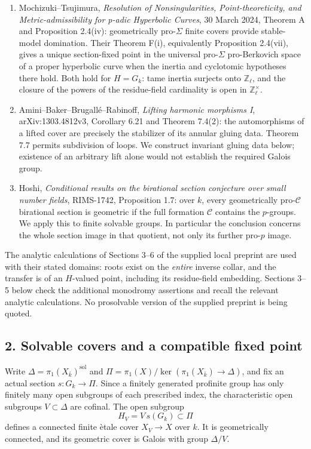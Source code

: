 \begin{enumerate}
\item Mochizuki--Tsujimura, \emph{Resolution of Nonsingularities,
Point-theoreticity, and Metric-admissibility for p-adic Hyperbolic
Curves}, 30 March 2024, Theorem A and Proposition 2.4(iv):
geometrically pro-$\Sigma$ finite covers provide stable-model domination.
Their Theorem F(i), equivalently Proposition 2.4(vii), gives a unique
section-fixed point in the universal pro-$\Sigma$ pro-Berkovich space
of a proper hyperbolic curve when the inertia and cyclotomic hypotheses
there hold.  Both hold for $H=G_k$: tame inertia surjects onto
$\mathbb Z_\ell$, and the closure of the powers of the residue-field
cardinality is open in $\mathbb Z_\ell^\times$.
\item Amini--Baker--Brugall\'e--Rabinoff, \emph{Lifting harmonic
morphisms I}, arXiv:1303.4812v3, Corollary 6.21 and Theorem 7.4(2):
the automorphisms of a lifted cover are precisely the stabilizer of
its annular gluing data.  Theorem 7.7 permits subdivision of loops.
We construct invariant gluing data below; existence of an arbitrary
lift alone would not establish the required Galois group.
\item Hoshi, \emph{Conditional results on the birational section
conjecture over small number fields}, RIMS-1742, Proposition 1.7:
over $k$, every geometrically pro-$\mathcal C$ birational section is
geometric if the full formation $\mathcal C$ contains the $p$-groups.
We apply this to finite solvable groups.  In particular the conclusion
concerns the whole section image in that quotient, not only its
further pro-$p$ image.
\end{enumerate}

The analytic calculations of Sections 3--6 of the supplied local
preprint are used with their stated domains: roots exist on the
\emph{entire} inverse collar, and the transfer is of an $H$-valued
point, including its residue-field embedding.  Sections 3--5 below
check the additional monodromy assertions and recall the relevant
analytic calculations.  No prosolvable version of the supplied
preprint is being quoted.

\subsection*{2. Solvable covers and a compatible fixed point}

Write $\Delta=\pi_1(X_{\bar k})^{\mathrm{sol}}$ and
$\Pi=\pi_1(X)/\ker(\pi_1(X_{\bar k})\to\Delta)$, and fix an actual
section $s:G_k\to\Pi$.  Since a finitely generated profinite group has
only finitely many open subgroups of each prescribed index, the
characteristic open subgroups $V\subset\Delta$ are cofinal.  The open
subgroup
\[
                 H_V=V\,s(G_k)\subset\Pi
\]
defines a connected finite \`etale cover $X_V\to X$ over $k$.
It is geometrically connected, and its geometric cover is Galois
with group $\Delta/V$.

